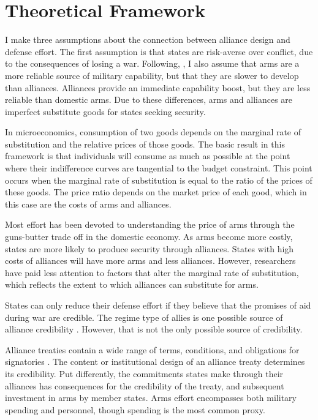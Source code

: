 \documentclass[12pt]{article}
\begin{document}
\section*{Theoretical Framework} 

I make three assumptions about the connection between alliance design and defense effort. The first assumption is that states are risk-averse over conflict, due to the consequences of losing a war. Following, \citet{Morrow1993}, I also assume that arms are a more reliable source of military capability, but that they are slower to develop than alliances. Alliances provide an immediate capability boost, but they are less reliable than domestic arms. Due to these differences, arms and alliances are imperfect substitute goods for states seeking security. 

In microeconomics, consumption of two goods depends on the marginal rate of substitution and the relative prices of those goods. The basic result in this framework is that individuals will consume as much as possible at the point where their indifference curves are tangential to the budget constraint. This point occurs when the marginal rate of substitution is equal to the ratio of the prices of these goods. The price ratio depends on the market price of each good, which in this case are the costs of arms and alliances. 

Most effort has been devoted to understanding the price of arms through the guns-butter trade off in the domestic economy. As arms become more costly, states are more likely to produce security through alliances. States with high costs of alliances will have more arms and less alliances. However, researchers have paid less attention to factors that alter the marginal rate of substitution, which reflects the extent to which alliances can substitute for arms. 

States can only reduce their defense effort if they believe that the promises of aid during war are credible. The regime type of allies is one possible source of alliance credibility \citep{DigiuseppePoast2016}. However, that is not the only possible source of credibility. 

Alliance treaties contain a wide range of terms, conditions, and obligations for signatories \citep{Benson2011, Chibaetal2015}. The content or institutional design of an alliance treaty determines its credibility. Put differently, the commitments states make through their alliances has consequences for the credibility of the treaty, and subsequent investment in arms by member states. Arms effort encompasses both military spending and personnel, though spending is the most common proxy. 
\end{document}
